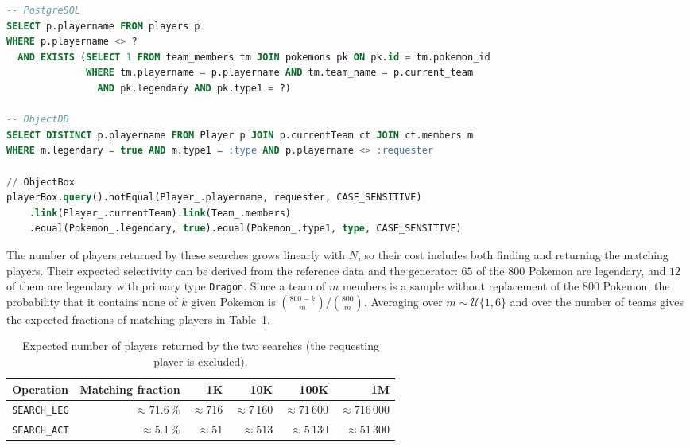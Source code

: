 \documentclass{article}
\begin{document}
\begin{lstlisting}[language=SQL, caption={\texttt{SEARCH\_ACT} in PostgreSQL (SQL), ObjectDB (JPQL) and ObjectBox (Java query builder).}, label={lst:search_act}]
-- PostgreSQL
SELECT p.playername FROM players p
WHERE p.playername <> ?
  AND EXISTS (SELECT 1 FROM team_members tm JOIN pokemons pk ON pk.id = tm.pokemon_id
              WHERE tm.playername = p.playername AND tm.team_name = p.current_team
                AND pk.legendary AND pk.type1 = ?)

-- ObjectDB
SELECT DISTINCT p.playername FROM Player p JOIN p.currentTeam ct JOIN ct.members m
WHERE m.legendary = true AND m.type1 = :type AND p.playername <> :requester

// ObjectBox
playerBox.query().notEqual(Player_.playername, requester, CASE_SENSITIVE)
    .link(Player_.currentTeam).link(Team_.members)
    .equal(Pokemon_.legendary, true).equal(Pokemon_.type1, type, CASE_SENSITIVE)
\end{lstlisting}

The number of players returned by these searches grows linearly with $N$, so their cost includes both finding and returning the matching players. Their expected selectivity can be derived from the reference data and the generator: $65$ of the $800$ Pokemon are legendary, and $12$ of them are legendary with primary type \texttt{Dragon}. Since a team of $m$ members is a sample without replacement of the $800$ Pokemon, the probability that it contains none of $k$ given Pokemon is $\binom{800-k}{m}/\binom{800}{m}$. Averaging over $m \sim \mathcal{U}\{1,6\}$ and over the number of teams gives the expected fractions of matching players in Table~\ref{tab:selectivity}.

\begin{table}[H]
    \centering
    \small
    \begin{tabular}{lrrrrr}
        \toprule
        \textbf{Operation} & \textbf{Matching fraction} & \textbf{1K} & \textbf{10K} & \textbf{100K} & \textbf{1M} \\
        \midrule
        \texttt{SEARCH\_LEG} & $\approx 71.6\,\%$ & $\approx 716$ & $\approx 7\,160$ & $\approx 71\,600$ & $\approx 716\,000$ \\
        \texttt{SEARCH\_ACT} & $\approx 5.1\,\%$  & $\approx 51$  & $\approx 513$    & $\approx 5\,130$  & $\approx 51\,300$  \\
        \bottomrule
    \end{tabular}
    \caption{Expected number of players returned by the two searches (the requesting player is excluded).}
    \label{tab:selectivity}
\end{table}
\end{document}
